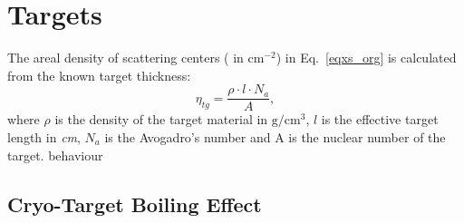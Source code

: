 \section{Targets}
 The areal density of scattering centers ( in $\mathrm{cm^{-2}}$) in Eq.~\eqref{eqxs_org} is calculated from the known target thickness:
\begin{equation}
  \eta_{tg} = \frac{\rho\cdot l \cdot N_{a}}{A},
  \label{eq_ntg}
\end{equation}
where $\rho$ is the density of the target material in $\mathrm{g/cm^{3}}$, $l$ is the effective target length in \emph{cm}, $N_{a}$ is the Avogadro's number and A is the nuclear number of the target.
behaviour
\subsection{Cryo-Target Boiling Effect}

